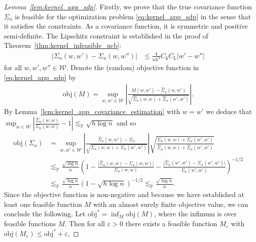 \documentclass[11pt,lof]{puthesis}
\renewcommand{\P}{\ensuremath{\mathbb{P}}}
\newcommand{\rL}{\ensuremath{\mathrm{L}}}
\newcommand{\rk}{\ensuremath{\mathrm{k}}}
\newcommand{\cW}{\ensuremath{\mathcal{W}}}
\newcommand{\objective}{\ensuremath{\mathrm{obj}}}
\theoremstyle{break}
\theoremstyle{proof}
\newtheorem{proof}{Proof}
\begin{document}
\begin{proof}[Lemma~\ref{lem:kernel_app_sdp}]

  Firstly, we prove that the true covariance function
  $\Sigma_n$
  is feasible for the optimization problem
  \eqref{eq:kernel_app_sdp} in the sense that it satisfies the constraints.
  As a covariance function, it is symmetric and positive semi-definite.
  The Lipschitz constraint is established in the proof of
  Theorem~\ref{thm:kernel_infeasible_ucb}:
  \begin{align*}
    \big| \Sigma_n(w,w') - \Sigma_n(w, w'') \big|
    &\leq
    \frac{4}{n h^3}
    C_\rk
    C_\rL
    |w'-w''|
  \end{align*}
  for all $w,w',w'' \in \cW$.
  Denote the (random) objective function
  in \eqref{eq:kernel_app_sdp} by
  \begin{align*}
    \objective(M) = \sup_{w,w' \in \cW}
    \left|
      \frac{M(w,w') - \hat\Sigma_n(w,w')}
      {\sqrt{\hat \Sigma_n(w,w) + \hat \Sigma_n(w',w')}}
    \right|.
  \end{align*}
  By Lemma~\ref{lem:kernel_app_covariance_estimation}
  with $w = w'$ we deduce that
  $\sup_{w \in \cW}
  \left|\frac{\hat \Sigma_n(w,w)}{\Sigma_n(w,w)} - 1\right|
  \lesssim_\P \sqrt{h \log n}$
  and so
  \begin{align*}
    \objective(\Sigma_n)
    &= \sup_{w,w' \in \cW}
    \left|
      \frac{\hat\Sigma_n(w,w') - \Sigma_n}
      {\sqrt{\Sigma_n(w,w) + \Sigma_n(w',w')}}
    \right|
    \sqrt{\frac{\Sigma_n(w,w) + \Sigma_n(w',w')}
    {\hat \Sigma_n(w,w) + \hat \Sigma_n(w',w')}} \\
    &\lesssim_\P
    \frac{\sqrt{\log n}}{n}
    \left(
      1 - \frac{\big|\hat \Sigma_n(w,w) - \Sigma_n(w,w)\big|}
      {\Sigma_n(w,w)}
      - \frac{\big|\hat \Sigma_n(w',w') - \Sigma_n(w',w')\big|}
      {\Sigma_n(w',w')}
    \right)^{-1/2} \\
    &\lesssim_\P
    \frac{\sqrt{\log n}}{n}
    \left(
      1 - \sqrt{h \log n}
    \right)^{-1/2}
    \lesssim_\P
    \frac{\sqrt{\log n}}{n}.
  \end{align*}
  Since the objective function
  is non-negative and because we have established
  at least one feasible function $M$ with
  an almost surely finite objective value,
  we can conclude the following.
  Let $\objective^* = \inf_M \objective(M)$,
  where the infimum is over feasible functions $M$.
  Then for all $\varepsilon > 0$
  there exists a feasible function $M_\varepsilon$ with
  $\objective(M_\varepsilon) \leq \objective^* + \varepsilon$,

\end{proof}
\end{document}
